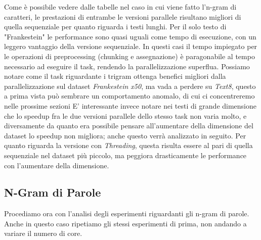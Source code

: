 \documentclass[10pt,twocolumn,letterpaper]{article}
\begin{document}
Come è possibile vedere dalle tabelle nel caso in cui viene fatto l'n-gram di caratteri, le prestazioni di entrambe le versioni parallele risultano migliori di quella sequenziale per quanto riguarda i testi lunghi. Per il solo testo di "Frankestein" le performance sono quasi uguali come tempo di esecuzione, con un leggero vantaggio della versione sequenziale. In questi casi il tempo impiegato per le operazioni di preprocessing (chunking e assegnazione) è paragonabile al tempo necessario ad eseguire il task, rendendo la parallelizzazione superflua. Possiamo notare come il task riguardante i trigram ottenga benefici migliori dalla parallelizzazione sul dataset \textit{Frankestein x50}, ma vada a perdere su \textit{Text8}, questo a prima vista può sembrare un comportamento anomalo, di cui ci concentreremo nelle prossime sezioni
E' interessante invece notare nei testi di grande dimensione che lo speedup fra le due versioni parallele dello stesso task non varia molto, e diversamente da quanto era possibile pensare all'aumentare della dimensione del dataset lo speedup non migliora; anche questo verrà analizzato in seguito. Per quanto riguarda la versione con \textit{Threading}, questa risulta essere al pari di quella sequenziale nel dataset più piccolo, ma peggiora drasticamente le performance con l'aumentare della dimensione. 

\subsection{N-Gram di Parole}
Procediamo ora con l'analisi degli esperimenti riguardanti gli n-gram di parole. Anche in questo caso ripetiamo gli stessi esperimenti di prima, non andando a variare il numero di core. 


\begin{table}[ht]
\centering
\caption{Confronto prestazioni nel calcolo dei Bi-gram di parole (8 Core)}
\label{tab:performance_comparison}
\end{table}
\end{document}
